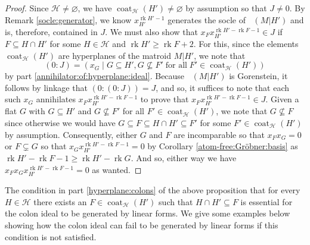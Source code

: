 \documentclass[11pt, reqno]{amsart}
\DeclareMathOperator{\Chow}{\underline{CH}}		%
\DeclareMathOperator{\coat}{coat}
\renewcommand{\emptyset}{\varnothing}
\newcommand{\iso}{\cong}
\DeclareMathOperator{\LL}{\mathcal{L}}
\DeclareMathOperator{\rk}{rk}
\theoremstyle{definition}
\newtheorem{question}[thm]{Question}
\numberwithin{equation}{section}
\numberwithin{table}{section}
\begin{document}
\begin{spacing}{1.1}
\begin{proof}
Since $\mathcal{H} \neq \emptyset$, we have $\coat_\mathcal{H}(H') \neq \emptyset$ by assumption so that $J \neq 0$.  By Remark \ref{socle:generator}, we know $x_{H'}^{\rk H' - 1}$ generates the socle of $\Chow(M\vert H')$ and is, therefore, contained in $J$.  We must also show that $x_Fx_{H'}^{\rk H' - \rk F - 1} \in J$ if $F \subseteq H \cap H'$ for some $H \in \mathcal{H}$ and $\rk H' \geq \rk F + 2$.  For this, since the elements $\coat_\mathcal{H}(H')$ are hyperplanes of the matroid $M\vert H'$, we note that 
\[ 
(0 : J) = (x_G \mid G \subseteq H', G \nsubseteq F'\; \text{for all}\; F' \in \coat_\mathcal{H}(H'))
\] 
by part \ref{annihilator:of:hyperplane:ideal}. Because $\Chow(M\vert H')$ is Gorenstein, it follows by linkage \cite[Theorem 21.23]{Eis95} that $(0 : (0 : J)) = J$, and so, it suffices to note that each such $x_G$ annihilates $x_Fx_{H'}^{\rk H' - \rk F - 1}$ to prove that $x_Fx_{H'}^{\rk H' - \rk F - 1} \in J$.  Given a flat $G$ with $G \subseteq H'$ and $G \nsubseteq F'$ for all $F' \in \coat_\mathcal{H}(H')$, we note that $G \nsubseteq F$ since otherwise we would have $G \subseteq F \subseteq H \cap H' \subseteq F'$ for some $F' \in \coat_\mathcal{H}(H')$ by assumption.  Consequently, either $G$ and $F$ are incomparable so that $x_Fx_G = 0$ or $F \subsetneq G$ so that $x_Gx_{H'}^{\rk H' - \rk F - 1} = 0$ by Corollary \ref{atom-free:Gröbner:basis} as $\rk H' - \rk F - 1 \geq \rk H' - \rk G$.  And so, either way we have $x_Fx_Gx_{H'}^{\rk H' - \rk F - 1} = 0$ as wanted.
\end{proof}


The condition in part \ref{hyperplane:colons} of the above proposition that for every $H \in \mathcal{H}$ there exists an $F \in \coat_\mathcal{H}(H')$ such that $H \cap H' \subseteq F$ is essential for the colon ideal to be generated by linear forms.  We give some examples below showing how the colon ideal can fail to be generated by linear forms if this condition is not satisfied.


\end{spacing}
\end{document}
